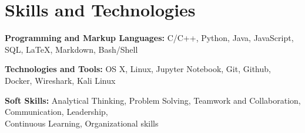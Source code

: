 
\section{Skills and Technologies}

\begin{onecolentry}
    \textbf{Programming and Markup Languages:} C/C++, Python, Java, JavaScript, SQL, LaTeX, Markdown, Bash/Shell
\end{onecolentry}

\vspace{0.2 cm} %

\begin{onecolentry}
    \textbf{Technologies and Tools:} OS X, Linux, Jupyter Notebook, Git, Github, Docker, Wireshark, Kali Linux
\end{onecolentry}

\vspace{0.2 cm} %

\begin{onecolentry}
    \textbf{Soft Skills:}  Analytical Thinking, Problem Solving, Teamwork and Collaboration, Communication, Leadership,\\ 
    \text{\hspace{1.68cm}} Continuous Learning, Organizational skills
\end{onecolentry}

